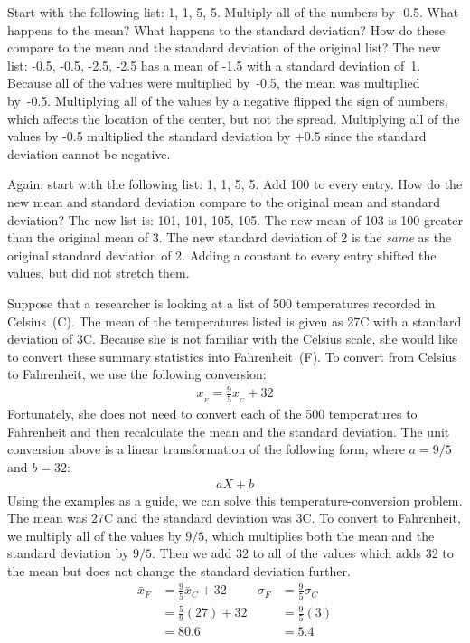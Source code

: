 \begin{examplewrap}
\begin{nexample}{Start with the following list:  {1, 1, 5, 5}. Multiply all of the numbers by \mbox{-0.5}. What happens to the mean? What happens to the standard deviation? How do these compare to the mean and the standard deviation of the original list?}
The new list: {-0.5, -0.5, -2.5, -2.5} has a mean of -1.5 with a standard deviation of~1. Because all of the values were multiplied by~\mbox{-0.5}, the mean was multiplied by~\mbox{-0.5}. Multiplying all of the values by a negative flipped the sign of numbers, which affects the location of the center, but not the spread. Multiplying all of the values by \mbox{-0.5} multiplied the standard deviation by +0.5 since the standard deviation cannot be negative.
\end{nexample}
\end{examplewrap}

\begin{examplewrap}
\begin{nexample}{Again, start with the following list: {1, 1, 5, 5}. Add 100 to every entry. How do the new mean and standard deviation compare to the original mean and standard deviation?}
The new list is: {101, 101, 105, 105}. The new mean of 103 is 100 greater than the original mean of 3. The new standard deviation of 2 is the \emph{same} as the original standard deviation of 2. Adding a constant to every entry shifted the values, but did not stretch them.
\end{nexample}
\end{examplewrap}

Suppose that a researcher is looking at a list of 500 temperatures recorded in Celsius~(C). The mean of the temperatures listed is given as 27\degree C with a standard deviation of 3\degree C. Because she is not familiar with the Celsius scale, she would like to convert these summary statistics into Fahrenheit~(F). To convert from Celsius to Fahrenheit, we use the following conversion:
\begin{align*}
x_{_F} = \frac{9}{5}x_{_C} + 32
\end{align*}
Fortunately, she does not need to convert each of the 500 temperatures to Fahrenheit and then recalculate the mean and the standard deviation. The unit conversion above is a linear transformation of the following form, where $a=9/5$ and $b=32$:
\begin{align*}
aX + b
\end{align*}
Using the examples as a guide, we can solve this temperature-conversion problem. The mean was 27\degree C and the standard deviation was 3\degree C. To convert to Fahrenheit, we multiply all of the values by $9/5$, which multiplies both the mean and the standard deviation by $9/5$. Then we add 32 to all of the values which adds 32 to the mean but does not change the standard deviation further.
\begin{align*}
\bar{x}_{F} &= \frac{9}{5}\bar{x}_{C} + 32 & \sigma_{F} &= \frac{9}{5}\sigma_{C} \\
&= \frac{5}{9}(27)+ 32 & &=\frac{9}{5}(3) \\
&=80.6 &  &=5.4
\end{align*}

